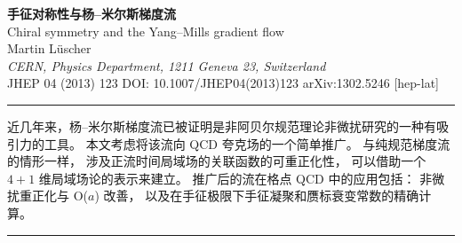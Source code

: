 \documentclass[11pt]{ctexart}
\begin{document}
\vspace{1.2cm}
\begin{center}
{\LARGE\bfseries 手征对称性与杨--米尔斯梯度流}\\[0.8em]
{\normalsize Chiral symmetry and the Yang--Mills gradient flow}\\[1.2em]
{\large Martin L\"uscher}\\[0.8em]
{\itshape CERN, Physics Department, 1211 Geneva 23, Switzerland}\\[0.9em]
{\footnotesize JHEP 04 (2013) 123 \quad DOI: 10.1007/JHEP04(2013)123 \quad arXiv:1302.5246 [hep-lat]}
\end{center}
\vspace{0.8em}
\noindent\rule{\linewidth}{0.4pt}
\vspace{0.6em}

\quad
近几年来，杨--米尔斯梯度流已被证明是非阿贝尔规范理论非微扰研究的一种有吸引力的工具。
本文考虑将该流向 QCD 夸克场的一个简单推广。
与纯规范梯度流的情形一样，
涉及正流时间局域场的关联函数的可重正化性，
可以借助一个 $4+1$ 维局域场论的表示来建立。
推广后的流在格点 QCD 中的应用包括：
非微扰重正化与 O($a$) 改善，
以及在手征极限下手征凝聚和赝标衰变常数的精确计算。

\vspace{0.6em}
\noindent\rule{\linewidth}{0.4pt}
\vspace{1.2em}












\end{document}
